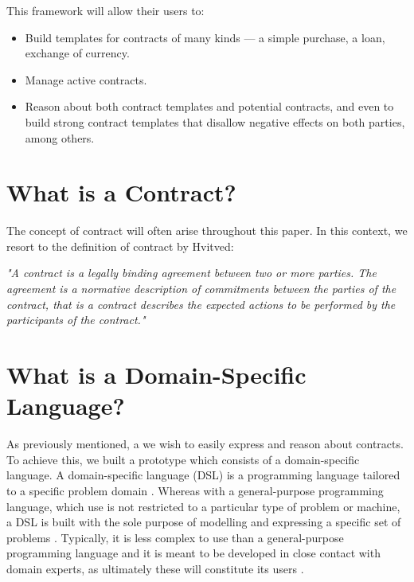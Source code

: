 \documentclass{ituthesis}
\begin{document}
This framework will allow their users to:
\begin{itemize}
    \item Build templates for contracts of many kinds --- a simple purchase, a loan, exchange of currency. \item Manage active contracts.
    \item Reason about both contract templates and potential contracts, and even to build strong contract templates that disallow negative effects on both parties, among others.
\end{itemize}

\section{What is a Contract?}

The concept of contract will often arise throughout this paper. In this context, we resort to the definition of contract by Hvitved:
\begin{displayquote}
\textit{"A contract is a legally binding agreement between two or more parties. The agreement is a normative description of commitments between the parties of the contract, that is a contract describes the expected actions to be performed by the participants of the contract."}
\cite{hvitved2011contract}
\end{displayquote}

\section{What is a Domain-Specific Language?}

As previously mentioned, a we wish to easily express and reason about contracts. To achieve this, we built a prototype which consists of a domain-specific language. A domain-specific language (DSL) is a programming language tailored to a specific problem domain \cite{whatsisadsl2005}. Whereas with a general-purpose programming language, which use is not restricted to a particular type of problem or machine, a DSL is built with the sole purpose of modelling and expressing a specific set of problems \cite{van2000domain}. %
Typically, it is less complex to use than a general-purpose programming language and it is meant to be developed in close contact with domain experts, as ultimately these will constitute its users \cite{dsl}.
\end{document}
